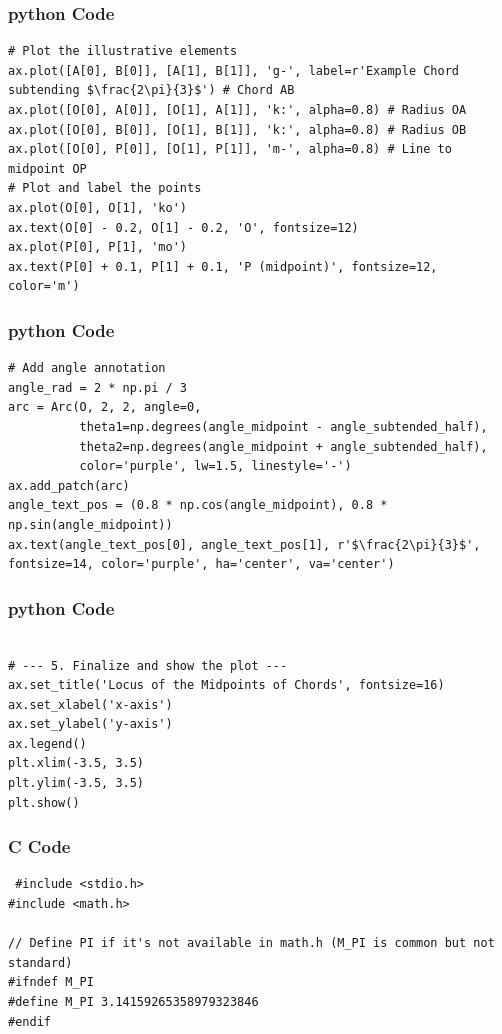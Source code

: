 \documentclass{beamer}
\begin{document}
\begin{frame}[fragile]
\frametitle{python Code}
\begin{lstlisting}
# Plot the illustrative elements
ax.plot([A[0], B[0]], [A[1], B[1]], 'g-', label=r'Example Chord subtending $\frac{2\pi}{3}$') # Chord AB
ax.plot([O[0], A[0]], [O[1], A[1]], 'k:', alpha=0.8) # Radius OA
ax.plot([O[0], B[0]], [O[1], B[1]], 'k:', alpha=0.8) # Radius OB
ax.plot([O[0], P[0]], [O[1], P[1]], 'm-', alpha=0.8) # Line to midpoint OP
# Plot and label the points
ax.plot(O[0], O[1], 'ko')
ax.text(O[0] - 0.2, O[1] - 0.2, 'O', fontsize=12)
ax.plot(P[0], P[1], 'mo')
ax.text(P[0] + 0.1, P[1] + 0.1, 'P (midpoint)', fontsize=12, color='m')
\end{lstlisting}
\end{frame}

\begin{frame}[fragile]
\frametitle{python Code}
\begin{lstlisting}
# Add angle annotation
angle_rad = 2 * np.pi / 3
arc = Arc(O, 2, 2, angle=0,
          theta1=np.degrees(angle_midpoint - angle_subtended_half),
          theta2=np.degrees(angle_midpoint + angle_subtended_half),
          color='purple', lw=1.5, linestyle='-')
ax.add_patch(arc)
angle_text_pos = (0.8 * np.cos(angle_midpoint), 0.8 * np.sin(angle_midpoint))
ax.text(angle_text_pos[0], angle_text_pos[1], r'$\frac{2\pi}{3}$', fontsize=14, color='purple', ha='center', va='center')
\end{lstlisting}
\end{frame}

\begin{frame}[fragile]
\frametitle{python Code}
\begin{lstlisting}

# --- 5. Finalize and show the plot ---
ax.set_title('Locus of the Midpoints of Chords', fontsize=16)
ax.set_xlabel('x-axis')
ax.set_ylabel('y-axis')
ax.legend()
plt.xlim(-3.5, 3.5)
plt.ylim(-3.5, 3.5)
plt.show()
\end{lstlisting}
\end{frame}

\begin{frame}[fragile]
\frametitle{C Code}
\begin{lstlisting}
 #include <stdio.h>
#include <math.h>

// Define PI if it's not available in math.h (M_PI is common but not standard)
#ifndef M_PI
#define M_PI 3.14159265358979323846
#endif
\end{lstlisting}
\end{frame}
\end{document}
